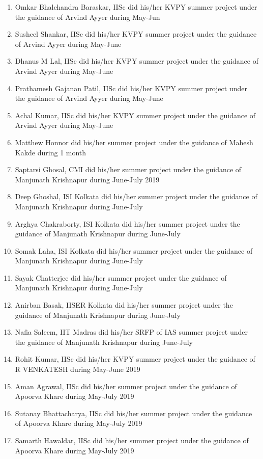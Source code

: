 \begin{enumerate}
\item Omkar Bhalchandra Baraskar, IISc did his/her KVPY summer project under the guidance of Arvind Ayyer during May-Jun
\item Susheel Shankar, IISc did his/her KVPY summer project under the guidance of Arvind Ayyer during May-June
\item Dhanus M Lal, IISc did his/her KVPY summer project under the guidance of Arvind Ayyer during May-June
\item Prathamesh Gajanan Patil, IISc did his/her KVPY summer project under the guidance of Arvind Ayyer during May-June
\item Achal Kumar, IISc did his/her KVPY summer project under the guidance of Arvind Ayyer during May-June
\item Matthew Honnor did his/her  summer project under the guidance of Mahesh Kakde during 1 month
\item Saptarsi Ghosal, CMI did his/her  summer project under the guidance of Manjunath Krishnapur during June-July 2019
\item Deep Ghoshal, ISI Kolkata did his/her  summer project under the guidance of Manjunath Krishnapur during June-July
\item Arghya Chakraborty, ISI Kolkata did his/her  summer project under the guidance of Manjunath Krishnapur during June-July
\item Somak Laha, ISI Kolkata did his/her  summer project under the guidance of Manjunath Krishnapur during June-July
\item Sayak Chatterjee did his/her  summer project under the guidance of Manjunath Krishnapur during June-July
\item Anirban Basak, IISER Kolkata did his/her  summer project under the guidance of Manjunath Krishnapur during June-July
\item Nafia Saleem, IIT Madras did his/her SRFP of IAS summer project under the guidance of Manjunath Krishnapur during June-July
\item Rohit Kumar, IISc did his/her KVPY summer project under the guidance of R VENKATESH during May-June 2019
\item Aman Agrawal, IISc did his/her  summer project under the guidance of Apoorva Khare during May-July 2019
\item Sutanay Bhattacharya, IISc did his/her  summer project under the guidance of Apoorva Khare during May-July 2019
\item Samarth Hawaldar, IISc did his/her  summer project under the guidance of Apoorva Khare during May-July 2019

\end{enumerate}
